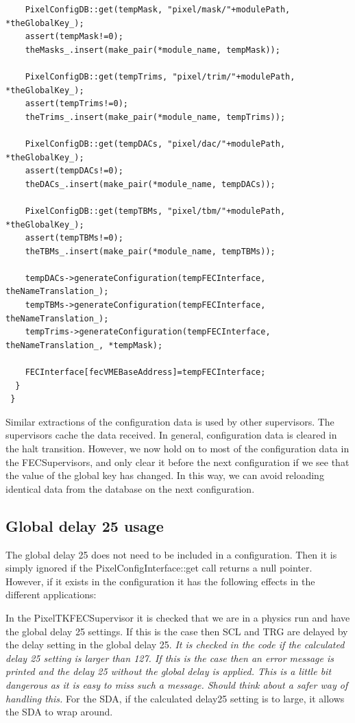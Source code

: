 \begin{verbatim}
    PixelConfigDB::get(tempMask, "pixel/mask/"+modulePath, *theGlobalKey_);
    assert(tempMask!=0);
    theMasks_.insert(make_pair(*module_name, tempMask));

    PixelConfigDB::get(tempTrims, "pixel/trim/"+modulePath, *theGlobalKey_);
    assert(tempTrims!=0);
    theTrims_.insert(make_pair(*module_name, tempTrims));

    PixelConfigDB::get(tempDACs, "pixel/dac/"+modulePath, *theGlobalKey_);
    assert(tempDACs!=0);
    theDACs_.insert(make_pair(*module_name, tempDACs));

    PixelConfigDB::get(tempTBMs, "pixel/tbm/"+modulePath, *theGlobalKey_);
    assert(tempTBMs!=0);
    theTBMs_.insert(make_pair(*module_name, tempTBMs));

    tempDACs->generateConfiguration(tempFECInterface, theNameTranslation_);
    tempTBMs->generateConfiguration(tempFECInterface, theNameTranslation_);
    tempTrims->generateConfiguration(tempFECInterface, theNameTranslation_, *tempMask);

    FECInterface[fecVMEBaseAddress]=tempFECInterface;
  }
 }
\end{verbatim}

Similar extractions of the configuration data is used by other
supervisors. The supervisors cache the data received. In general, configuration data
is cleared in the halt transition. However, we now hold on to most of the configuration data in the FECSupervisors, and only
clear it before the next configuration if we see that the value of the global key has changed. In this way, we can avoid reloading
identical data from the database on the next configuration.

\subsection{Global delay 25 usage}

The global delay 25 does not need to be included in a configuration. Then it
is simply ignored if the PixelConfigInterface::get call returns a 
null pointer. However, if it exists in the configuration it has the
following effects in the different applications:

In the PixelTKFECSupervisor it is checked that we are in a physics
run and have the global delay 25 settings. If this is the case then
SCL and TRG are delayed by the delay setting in the global delay 25.
{\it It is checked in the code if the calculated delay 25 setting is 
larger than 127. If this is the case then an error message is printed
and the delay 25 without the global delay is applied. This is a little
bit dangerous as it is easy to miss such a message. Should think about 
a safer way of handling this.}
For the SDA, if the calculated delay25 setting is to large, it allows
the SDA to wrap around. 

